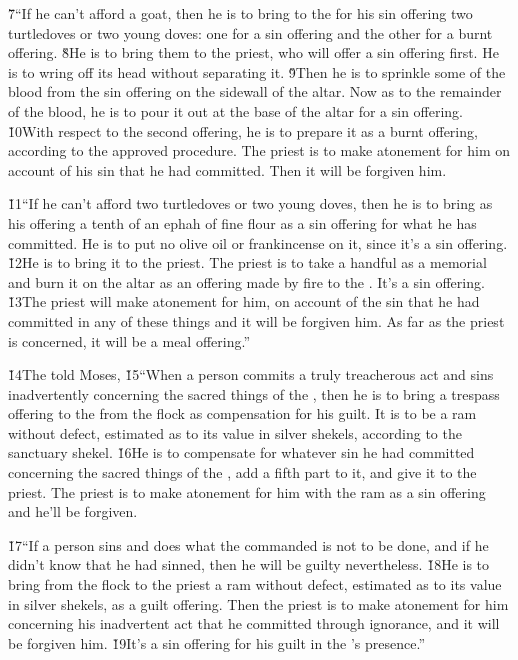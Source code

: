 \v{7}``If he can't afford a goat, then he is to bring to the  for his sin offering two turtledoves or two young doves: one for a sin offering and the other for a burnt offering. \v{8}He is to bring them to the priest, who will offer a sin offering first. He is to wring off its head without separating it. \v{9}Then he is to sprinkle some of the blood from the sin offering on the sidewall of the altar. Now as to the remainder of the blood, he is to pour it out at the base of the altar for a sin offering. \v{10}With respect to the second offering, he is to prepare it as a burnt offering, according to the approved procedure. The priest is to make atonement for him on account of his sin that he had committed. Then it will be forgiven him.

\v{11}``If he can't afford two turtledoves or two young doves, then he is to bring as his offering a tenth of an ephah of fine flour as a sin offering for what he has committed. He is to put no olive oil or frankincense on it, since it's a sin offering. \v{12}He is to bring it to the priest. The priest is to take a handful as a memorial and burn it on the altar as an offering made by fire to the . It's a sin offering. \v{13}The priest will make atonement for him, on account of the sin that he had committed in any of these things and it will be forgiven him. As far as the priest is concerned, it will be a meal offering.''

\v{14}The  told Moses, \v{15}``When a person commits a truly treacherous act and sins inadvertently concerning the sacred things of the , then he is to bring a trespass offering to the  from the flock as compensation for his guilt. It is to be a ram without defect, estimated as to its value in silver shekels, according to the sanctuary shekel. \v{16}He is to compensate for whatever sin he had committed concerning the sacred things of the , add a fifth part to it, and give it to the priest. The priest is to make atonement for him with the ram as a sin offering and he'll be forgiven.

\v{17}``If a person sins and does what the  commanded is not to be done, and if he didn't know that he had sinned, then he will be guilty nevertheless. \v{18}He is to bring from the flock to the priest a ram without defect, estimated as to its value in silver shekels, as a guilt offering. Then the priest is to make atonement for him concerning his inadvertent act that he committed through ignorance, and it will be forgiven him. \v{19}It's a sin offering for his guilt in the 's presence.''

